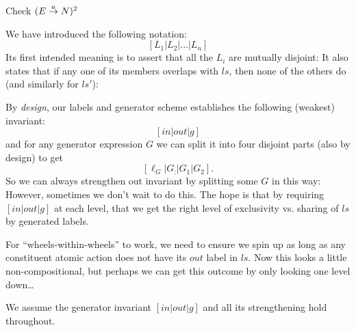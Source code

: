 Check $(E \stackrel{a}\rightarrow N)^2$

\newpage
{}

We have introduced the following notation:
\[
  [ L_1 | L_2 | \dots | L_n ]
\]
Its first intended meaning is to assert that
all the $L_i$ are mutually disjoint:
It also states that if any one of its members overlaps with $ls$,
then none of the others do (and similarly for $ls'$):

By \emph{design}, our labels and generator scheme
establishes the following (weakest) invariant:
\[ [in|out|g]\]
and for any generator expression $G$ we can split it into
four disjoint parts (also by design) to get
\[  [\ell_G|G_{:}|G_1|G_2] . \]
So we can always strengthen out invariant by splitting some $G$
in this way:
However, sometimes we don't wait to do this.
The hope is that by requiring $[in|out|g]$ at each level,
that we get the right level of exclusivity vs. sharing of $ls$
by generated labels.

\newpage
{}

For ``wheels-within-wheels'' to work,
we need to ensure we spin up as long as any constituent
atomic action does not have its $out$ label in $ls$.
Now this looks a little non-compositional,
but perhaps we can get this outcome by only looking one level down\dots

We assume the generator invariant $[in|out|g]$
and all its strengthening hold throughout.



